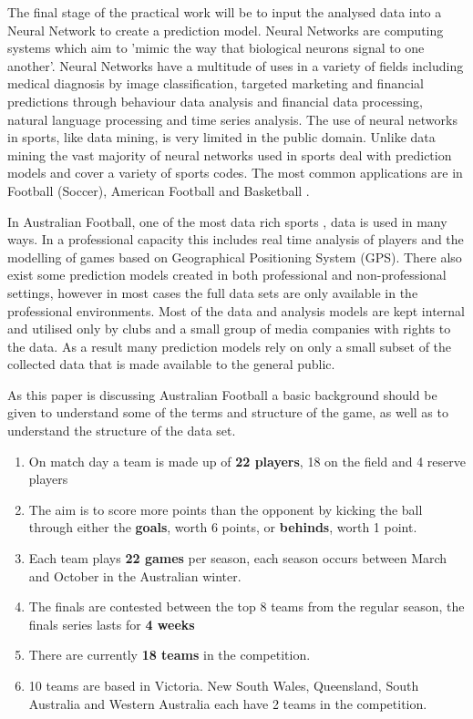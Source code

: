 \documentclass{imc-inf}
\begin{document}
	The final stage of the practical work will be to input the analysed data into a Neural Network to create a prediction model. Neural Networks are computing systems which aim to 'mimic the way that biological neurons signal to one another'\cite{website:IBM}. Neural Networks have a multitude of uses in a variety of fields including medical diagnosis by image classification, targeted marketing and financial predictions through behaviour data analysis and financial data processing, natural language processing and time series analysis. The use of neural networks in sports, like data mining, is very limited in the public domain. Unlike data mining the vast majority of neural networks used in sports deal with prediction models and cover a variety of sports codes. The most common applications are in Football (Soccer)\cite{website:Medium_Soccer}, American Football
	\cite{NN_NFL} \cite{CollegeFootball} and Basketball \cite{Basketball} \cite{Basketball_2}. 
	\newline
	
	In Australian Football, one of the most data rich sports \cite{website:Vice}, data is used in many ways. In a professional capacity this includes real time analysis of players and the modelling of games based on Geographical Positioning System (GPS). There also exist some prediction models created in both professional and non-professional settings, however in most cases the full data sets are only available in the professional environments. Most of the data and analysis models are kept internal and utilised only by clubs and a small group of media companies with rights to the data. As a result many prediction models rely on only a small subset of the collected data that is made available to the general public.
	\newline
	
	As this paper is discussing Australian Football a basic background should be given to understand some of the terms and structure of the game, as well as to understand the structure of the data set. 
	\begin{enumerate}
		\item On match day a team is made up of \textbf{22 players}, 18 on the field and 4 reserve players
		\item The aim is to score more points than the opponent by kicking the ball through either the \textbf{goals}, worth 6 points, or \textbf{behinds}, worth 1 point.
		\item Each team plays \textbf{22 games} per season, each season occurs between March and October in the Australian winter.
		\item The finals are contested between the top 8 teams from the regular season, the finals series lasts for \textbf{4 weeks}
		\item There are currently \textbf{18 teams} in the competition.
		\item 10 teams are based in Victoria. New South Wales, Queensland, South Australia and Western Australia each have 2 teams in the competition.
	\end{enumerate}
	
\end{document}
